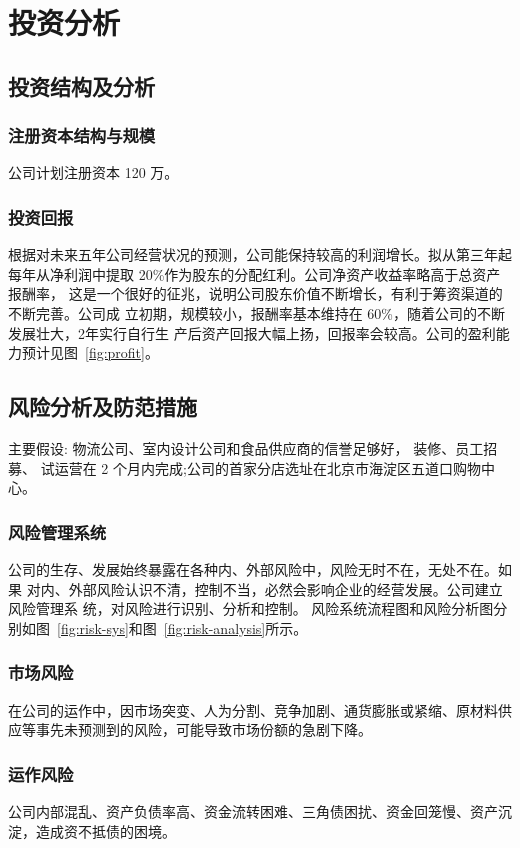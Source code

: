 \chapter{投资分析}
\section{投资结构及分析}
\subsection{注册资本结构与规模}
公司计划注册资本 120 万。

\subsection{投资回报}
根据对未来五年公司经营状况的预测，公司能保持较高的利润增长。拟从第三年起
每年从净利润中提取 20\%作为股东的分配红利。公司净资产收益率略高于总资产报酬率，
这是一个很好的征兆，说明公司股东价值不断增长，有利于筹资渠道的不断完善。公司成
立初期，规模较小，报酬率基本维持在 60\%，随着公司的不断发展壮大，2年实行自行生
产后资产回报大幅上扬，回报率会较高。公司的盈利能力预计见图~\ref{fig:profit}。


\section{风险分析及防范措施}
主要假设: 物流公司、室内设计公司和食品供应商的信誉足够好， 装修、员工招募、
试运营在 2 个月内完成;公司的首家分店选址在北京市海淀区五道口购物中心。

\subsection{风险管理系统}
公司的生存、发展始终暴露在各种内、外部风险中，风险无时不在，无处不在。如果
对内、外部风险认识不清，控制不当，必然会影响企业的经营发展。公司建立风险管理系
统，对风险进行识别、分析和控制。
风险系统流程图和风险分析图分别如图~\ref{fig:risk-sys}和图~\ref{fig:risk-analysis}所示。


\subsection{市场风险}
在公司的运作中，因市场突变、人为分割、竞争加剧、通货膨胀或紧缩、原材料供
应等事先未预测到的风险，可能导致市场份额的急剧下降。

\subsection{运作风险}
公司内部混乱、资产负债率高、资金流转困难、三角债困扰、资金回笼慢、资产沉
淀，造成资不抵债的困境。


